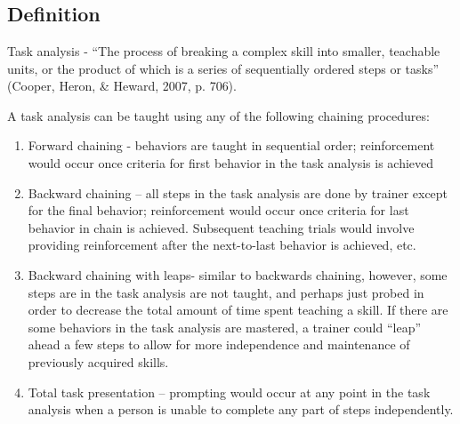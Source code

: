 \clearpage \section{\fourdSeven{}}
\subsection{Definition}
Task analysis - ``The process of breaking a complex skill into smaller, teachable units, or the product of which is a series of sequentially ordered steps or tasks'' (Cooper, Heron, \& Heward, 2007, p. 706).

A task analysis can be taught using any of the following chaining procedures:
\begin{enumerate}
\item Forward chaining -  behaviors are taught in sequential order; reinforcement would occur once criteria for first behavior in the task analysis is achieved
\item Backward chaining – all steps in the task analysis are done by trainer except for the final behavior; reinforcement would occur once criteria for last behavior in chain is achieved.  Subsequent teaching trials would involve providing reinforcement after the next-to-last behavior is achieved, etc.
\item  Backward chaining with leaps- similar to backwards chaining, however, some steps are in the task analysis are not taught, and perhaps just probed in order to decrease the total amount of time spent teaching a skill.  If there are some behaviors in the task analysis are mastered, a trainer could ``leap'' ahead a few steps to allow for more independence and maintenance of previously acquired skills.
\item Total task presentation – prompting would occur at any point in the task analysis when a person is unable to complete any part of steps independently.
\end{enumerate}
%
